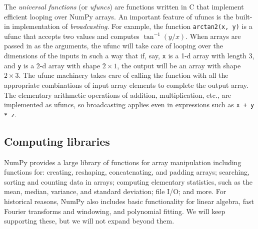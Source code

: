 \documentclass[fleqn,10pt]{wlscirep}
\newcommand{\code}[1]{\texttt{#1}}
\begin{document}
The \emph{universal functions} (or \emph{ufuncs})
are functions written in C that implement efficient looping over
NumPy arrays. An important feature of ufuncs is the built-in
implementation of \emph{broadcasting}.  For example, the function
\code{arctan2(x, y)} is a ufunc that accepts two values and computes
$\tan^{-1}(y/x)$.  When arrays are passed in as the arguments,
the ufunc will take care of looping over the dimensions of the inputs
in such a way that if, say, \code{x} is a 1-d array with length 3, and
\code{y} is a 2-d array with shape $2 \times 1$, the output will be
an array with shape $2 \times 3$.  The ufunc machinery takes care
of calling the function with all the appropriate combinations of
input array elements to complete the output array.
The elementary arithmetic operations of addition, multiplication, etc.,
are implemented as ufuncs, so broadcasting applies even in expressions
such as \code{x + y * z}.

\subsection*{Computing libraries}

NumPy provides a large library of functions for array manipulation
including functions for: creating, reshaping, concatenating, and padding arrays;
searching, sorting and counting data
in arrays; computing elementary statistics, such as the mean, median,
variance, and standard deviation; file I/O; and more.
For historical reasons, NumPy also includes basic functionality for
linear algebra,
fast Fourier transforms and windowing,
and polynomial fitting.
We will keep supporting these, but we will not expand beyond them.




%

%
\end{document}
